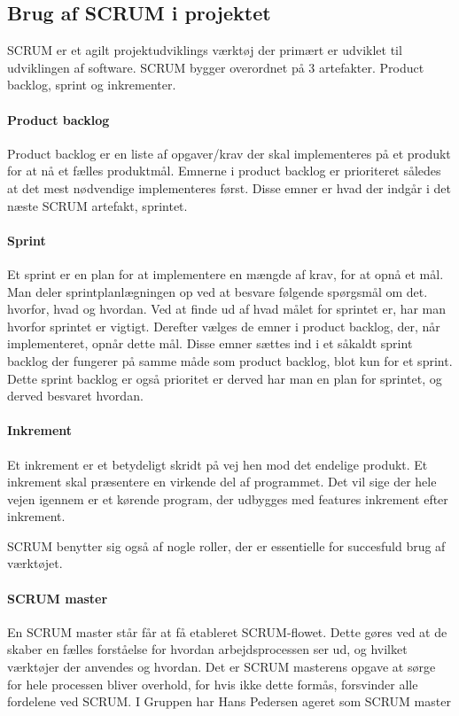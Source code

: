 \subsection{Brug af SCRUM i projektet}
SCRUM er et agilt projektudviklings værktøj der primært er udviklet til udviklingen af software. SCRUM bygger overordnet på 3 artefakter. Product backlog, sprint og inkrementer. 

\paragraph{Product backlog}
Product backlog er en liste af opgaver/krav der skal implementeres på et produkt for at nå et fælles produktmål. Emnerne i product backlog er prioriteret således at det mest nødvendige implementeres først. Disse emner er hvad der indgår i det næste SCRUM artefakt, sprintet.

\paragraph{Sprint}
Et sprint er en plan for at implementere en mængde af krav, for at opnå et mål. Man deler sprintplanlægningen op ved at besvare følgende spørgsmål om det. hvorfor, hvad og hvordan. Ved at finde ud af hvad målet for sprintet er, har man hvorfor sprintet er vigtigt. Derefter vælges de emner i product backlog, der, når implementeret, opnår dette mål. Disse emner sættes ind i et såkaldt sprint backlog der fungerer på samme måde som product backlog, blot kun for et sprint. Dette sprint backlog er også prioritet er derved har man en plan for sprintet, og derved besvaret hvordan.

\paragraph{Inkrement}
Et inkrement er et betydeligt skridt på vej hen mod det endelige produkt. Et inkrement skal præsentere en virkende del af programmet. Det vil sige der hele vejen igennem er et kørende program, der udbygges med features inkrement efter inkrement. 

SCRUM benytter sig også af nogle roller, der er essentielle for succesfuld brug af værktøjet. 

\paragraph{SCRUM master}
En SCRUM master står får at få etableret SCRUM-flowet. Dette gøres ved at de skaber en fælles forståelse for hvordan arbejdsprocessen ser ud, og hvilket værktøjer der anvendes og hvordan. Det er SCRUM masterens opgave at sørge for hele processen bliver overhold, for hvis ikke dette formås, forsvinder alle fordelene ved SCRUM. 
I Gruppen har Hans Pedersen ageret som SCRUM master

